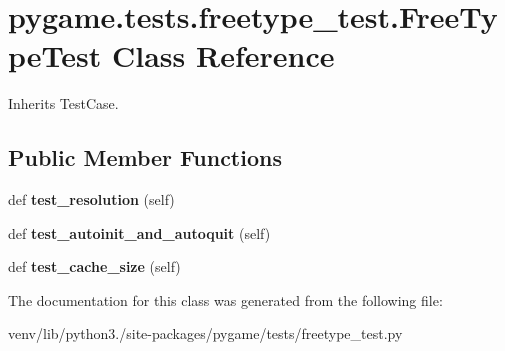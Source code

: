 \hypertarget{classpygame_1_1tests_1_1freetype__test_1_1_free_type_test}{}\section{pygame.\+tests.\+freetype\+\_\+test.\+Free\+Type\+Test Class Reference}
\label{classpygame_1_1tests_1_1freetype__test_1_1_free_type_test}


Inherits Test\+Case.

\subsection*{Public Member Functions}
\begin{DoxyCompactItemize}
\item 
\mbox{\label{classpygame_1_1tests_1_1freetype__test_1_1_free_type_test_a64e84f040228f1d96d3f8ba0dfad427b}} 
def {\bfseries test\+\_\+resolution} (self)
\item 
\mbox{\label{classpygame_1_1tests_1_1freetype__test_1_1_free_type_test_ae5eb6e25d2005f0e84ef9237f7bb6272}} 
def {\bfseries test\+\_\+autoinit\+\_\+and\+\_\+autoquit} (self)
\item 
\mbox{\label{classpygame_1_1tests_1_1freetype__test_1_1_free_type_test_a26a01b25292c4fd85a01500a59f25748}} 
def {\bfseries test\+\_\+cache\+\_\+size} (self)
\end{DoxyCompactItemize}


The documentation for this class was generated from the following file\+:\begin{DoxyCompactItemize}
\item 
venv/lib/python3./site-\/packages/pygame/tests/freetype\+\_\+test.\+py\end{DoxyCompactItemize}
